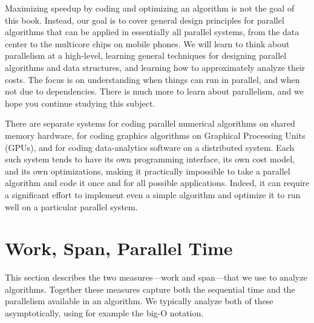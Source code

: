 \begin{cluster}
\label{grp:grm:introduction::parallelism::maximizing}

\begin{gram}
\label{grm:introduction::parallelism::maximizing}
Maximizing speedup by coding and optimizing an algorithm is not the
goal of this book.
Instead, our goal is to cover general design principles for parallel
algorithms that can be applied in essentially all parallel systems,
from the data center to the multicore chips on mobile phones.
We will learn to think about parallelism at a high-level, learning
general techniques for designing parallel algorithms and data
structures, and learning how to approximately analyze their costs.
The focus is on understanding when things can run in parallel, and
when not due to dependencies.  
There is much more to learn about parallelism, and we hope you
continue studying this subject.

\end{gram}
\end{cluster}

\begin{cluster}
\label{grp:xmpl:introduction::parallelism::separate}

\begin{example}
\label{xmpl:introduction::parallelism::separate}
There are separate systems for coding parallel numerical
algorithms on shared memory hardware, for coding graphics algorithms
on Graphical Processing Units (GPUs), and for coding data-analytics
software on a distributed system.
Each such system tends to have its own programming interface, its own
cost model, and its own optimizations, making it practically
impossible to take a parallel algorithm and code it once and for all 
possible applications.
Indeed, it can require a significant effort to implement even a simple
algorithm and optimize it to run well on a particular parallel system. 

\end{example}
\end{cluster}


\section{Work, Span, Parallel Time}
\label{sec:introduction::parallelism::work-span}

\begin{cluster}
\label{grp:grm:introduction::parallelism::describes}

\begin{gram}
\label{grm:introduction::parallelism::describes}
This section describes the two measures---work and span---that we use
to analyze algorithms.  Together these measures capture both the
sequential time and the parallelism available in an algorithm.
We typically analyze both of these asymptotically, using
for example the big-O notation.

\end{gram}
\end{cluster}


